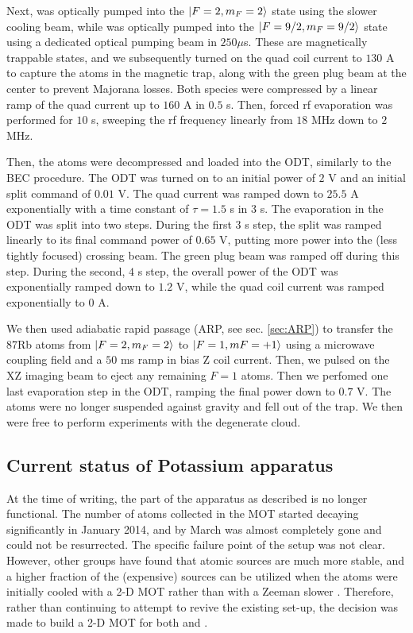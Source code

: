 Next, \Rb{} was optically pumped into the $\mathinner{|{F=2, m_F=2}\rangle}$ state using the slower cooling beam, while \K{} was optically pumped into the $\mathinner{|{F=9/2,m_F=9/2}\rangle}$ state using a dedicated optical pumping beam in $250 \mu$s. These are magnetically trappable states, and we subsequently turned on the quad coil current to $130$ A to capture the atoms in the magnetic trap, along with the green plug beam at the center to prevent Majorana losses. Both species were compressed by a linear ramp of the quad current up to $160$ A in $0.5$ s. Then, forced rf evaporation was performed for $10$ s, sweeping the rf frequency linearly from $18$ MHz down to $2$ MHz.

Then, the atoms were decompressed and loaded into the ODT, similarly to the BEC procedure. The ODT was turned on to an initial power of $2$ V and an initial split command of $0.01$ V. The quad current was ramped down to $25.5$ A exponentially with a time constant of $\tau=1.5$ s in $3$ s. The evaporation in the ODT was split into two steps. During the first $3$ s step, the split was ramped linearly to its final command power of $0.65$ V, putting more power into the (less tightly focused) crossing beam. The green plug beam was ramped off during this step. During the second, $4$ s step, the overall power of the ODT was exponentially ramped down to $1.2$ V, while the quad coil current was ramped exponentially to $0$ A.


We then used adiabatic rapid passage (ARP, see sec. \ref{sec:ARP}) to transfer the 87Rb atoms from $\mathinner{|{F = 2,m_F = 2}\rangle}$ to $\mathinner{|{F = 1,mF = +1}\rangle}$ using a microwave coupling field and a $50$ ms ramp in bias Z coil current. Then, we pulsed on the XZ imaging beam to eject any remaining $F=1$ atoms. Then we perfomed one last evaporation step in the ODT, ramping the final power down to $0.7$ V. The \Rb{} atoms were no longer suspended against gravity and fell out of the trap. We then were free to perform experiments with the degenerate \K{} cloud. 

\subsection{Current status of Potassium apparatus}

At the time of writing, the \K{} part of the apparatus as described is no longer functional. The number of \K{} atoms collected in the MOT started decaying significantly in January 2014, and by March was almost completely gone and could not be resurrected. The specific failure point of the setup was not clear. However, other groups have found that atomic sources are much more stable, and a higher fraction of the (expensive) \K{} sources can be utilized when the atoms were initially cooled with a 2-D MOT rather than with a Zeeman slower \cite{Catani2006,UehlingerThesis,Pedrozo2016}. Therefore, rather than continuing to attempt to revive the existing set-up, the decision was made to build a 2-D MOT for both \K{} and \Rb{}.

